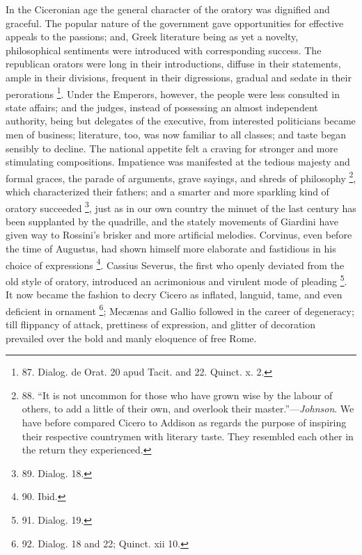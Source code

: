 In the Ciceronian age the
general character of the oratory was dignified and graceful. The
popular nature of the government gave opportunities for effective
appeals to the passions; and, Greek literature being as yet a novelty,
philosophical sentiments were introduced with corresponding success.
The republican orators were long in their introductions, diffuse in
their statements, ample in their divisions, frequent in their
digressions, gradual and sedate in their perorations \footnote{87. Dialog. de Orat. 20 apud
Tacit. and 22. Quinct. x. 2.}. Under
the Emperors, however, the people were less consulted in state
affairs; and the judges, instead of possessing an almost
independent authority, being but delegates of the executive, from
interested politicians became men of business; literature, too, was
now familiar to all classes; and taste began sensibly to decline. The
national appetite felt a craving for stronger and more stimulating
compositions. Impatience was manifested at the tedious majesty and
formal graces, the parade of arguments, grave sayings, and shreds of
philosophy \footnote{88.
``It is not uncommon for
those who have grown wise by the labour of others, to add a little of
their own, and overlook their master.''—\emph{Johnson}. We have
before compared Cicero to Addison as regards the purpose of inspiring
their respective countrymen with literary taste. They resembled each
other in the return they experienced.}, which characterized their fathers; and a smarter
and more sparkling kind of oratory succeeded \footnote{89. Dialog. 18.}, just as in our
own country the minuet of the last century has been supplanted by the
quadrille, and the stately movements of Giardini have given way to
Rossini's brisker and more artificial melodies. Corvinus, even
before the time of Augustus, had shown himself more elaborate and
fastidious in his choice of expressions \footnote{90. Ibid.}. Cassius Severus,
the first who openly deviated from the old style of oratory,
introduced an acrimonious and virulent mode of pleading \footnote{91. Dialog. 19.}. It
now became the fashion to decry Cicero as inflated, languid, tame, and
even deficient in ornament \footnote{92. Dialog. 18 and 22; Quinct.
xii 10.}; Mecænas and Gallio followed in
the career of degeneracy; till flippancy of attack, prettiness of
expression, and glitter of decoration prevailed over the bold and
manly eloquence of free Rome.



